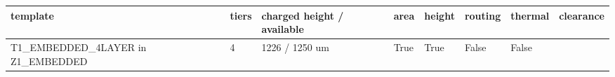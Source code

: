 \documentclass[10pt,]{article}
\begin{document}
\begin{longtable}[]{@{}llllllll@{}}
\toprule
\begin{minipage}[b]{0.10\columnwidth}\raggedright
template\strut
\end{minipage} & \begin{minipage}[b]{0.10\columnwidth}\raggedright
tiers\strut
\end{minipage} & \begin{minipage}[b]{0.10\columnwidth}\raggedright
charged height / available\strut
\end{minipage} & \begin{minipage}[b]{0.10\columnwidth}\raggedright
area\strut
\end{minipage} & \begin{minipage}[b]{0.10\columnwidth}\raggedright
height\strut
\end{minipage} & \begin{minipage}[b]{0.10\columnwidth}\raggedright
routing\strut
\end{minipage} & \begin{minipage}[b]{0.10\columnwidth}\raggedright
thermal\strut
\end{minipage} & \begin{minipage}[b]{0.10\columnwidth}\raggedright
clearance\strut
\end{minipage}\tabularnewline
\midrule
\endhead
\begin{minipage}[t]{0.10\columnwidth}\raggedright
T1\_EMBEDDED\_4LAYER in Z1\_EMBEDDED\strut
\end{minipage} & \begin{minipage}[t]{0.10\columnwidth}\raggedright
4\strut
\end{minipage} & \begin{minipage}[t]{0.10\columnwidth}\raggedright
1226 / 1250 um\strut
\end{minipage} & \begin{minipage}[t]{0.10\columnwidth}\raggedright
True\strut
\end{minipage} & \begin{minipage}[t]{0.10\columnwidth}\raggedright
True\strut
\end{minipage} & \begin{minipage}[t]{0.10\columnwidth}\raggedright
False\strut
\end{minipage} & \begin{minipage}[t]{0.10\columnwidth}\raggedright
False\strut
\end{minipage} & \begin{minipage}[t]{0.10\columnwidth}\raggedright

\end{minipage}
\end{longtable}
\end{document}
